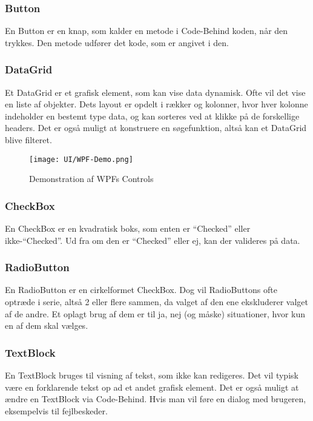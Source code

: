 \subsubsection*{Button}
En Button er en knap, som kalder en metode i Code-Behind koden, når den trykkes. 
Den metode udfører det kode, som er angivet i den.

\subsubsection*{DataGrid}
Et DataGrid er et grafisk element, som kan vise data dynamisk.
Ofte vil det vise en liste af objekter.
Dets layout er opdelt i rækker og kolonner, hvor hver kolonne indeholder en bestemt type data, og kan sorteres ved at klikke på de forskellige headers.
Det er også muligt at konstruere en søgefunktion, altså kan et DataGrid blive filteret.

\begin{wrapfigure}[22]{R}{0.5\textwidth}
    \label{img:wpfdemo}
    \vspace{-30pt}
    \begin{center}
        \texttt{[image: UI/WPF-Demo.png]}
    \end{center}
    \vspace{-15pt}
    \caption{Demonstration af WPFs Controls}
    \vspace{-15pt}
\end{wrapfigure}

\subsubsection*{CheckBox}
En CheckBox er en kvadratisk boks, som enten er ``Checked'' eller ikke-``Checked''. 
Ud fra om den er ``Checked'' eller ej, kan der valideres på data. 

\subsubsection*{RadioButton}
En RadioButton er en cirkelformet CheckBox.
Dog vil RadioButtons ofte optræde i serie, altså 2 eller flere sammen, da valget af den ene ekskluderer valget af de andre. 
Et oplagt brug af dem er til ja, nej (og måske) situationer, hvor kun en af dem skal vælges.

\subsubsection*{TextBlock}
En TextBlock bruges til visning af tekst, som ikke kan redigeres.
Det vil typisk være en forklarende tekst op ad et andet grafisk element.
Det er også muligt at ændre en TextBlock via Code-Behind. 
Hvis man vil føre en dialog med brugeren, eksempelvis til fejlbeskeder.

